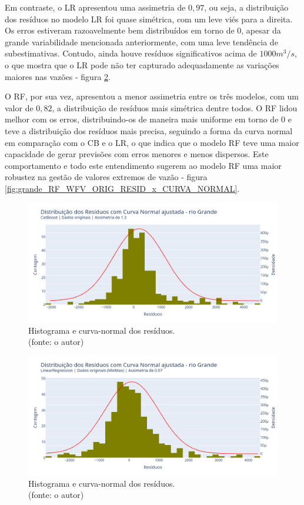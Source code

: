 Em contraste, o LR apresentou uma assimetria de $0,97$, ou seja, a distribuição dos resíduos no modelo LR foi quase simétrica, com um leve viés para a direita. Os erros estiveram razoavelmente bem distribuídos em torno de $0$, apesar da grande variabilidade mencionada anteriormente, com uma leve tendência de subestimativas. Contudo, ainda houve resíduos significativos acima de $1000 m^3/s$, o que mostra que o LR pode não ter capturado adequadamente as variações maiores nas vazões - figura \ref{fig:grande_LR_WFV_ORIG_RESID_x_CURVA_NORMAL}.

O RF, por sua vez, apresentou a menor assimetria entre os três modelos, com um valor de $0,82$, a distribuição de resíduos mais simétrica dentre todos. O RF lidou melhor com os erros, distribuindo-os de maneira mais uniforme em torno de $0$ e teve a distribuição dos resíduos mais precisa, seguindo a forma da curva normal em comparação com o CB e o LR, o que indica que o modelo RF teve uma maior capacidade de gerar previsões com erros menores e menos dispersos. Este comportamento e todo este entendimento sugerem ao modelo RF uma maior robustez na gestão de valores extremos de vazão - figura \ref{fig:grande_RF_WFV_ORIG_RESID_x_CURVA_NORMAL}.

\begin{figure}[!h]
	\centering
	\includegraphics[scale=0.33]{Figuras/rio_grande/wfv/CB/CB_WFV_ORIG_RESID_x_CURVA_NORMAL.png}
	\caption{Histograma e curva-normal dos resíduos.\\(fonte: o autor)}
	\label{fig:grande_CB_WFV_ORIG_RESID_x_CURVA_NORMAL}
\end{figure}

\begin{figure}[!h]
	\centering
	\includegraphics[scale=0.33]{Figuras/rio_grande/wfv/LR/LR_WFV_ORIG_RESID_x_CURVA_NORMAL.png}
	\caption{Histograma e curva-normal dos resíduos.\\(fonte: o autor)}
	\label{fig:grande_LR_WFV_ORIG_RESID_x_CURVA_NORMAL}
\end{figure}

